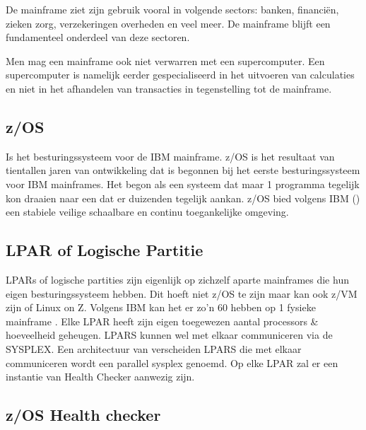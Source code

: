 De mainframe ziet zijn gebruik vooral in volgende sectors: banken, financiën, zieken zorg, verzekeringen overheden en veel meer. De mainframe blijft een fundamenteel onderdeel van deze sectoren.  

Men mag een mainframe ook niet verwarren met een supercomputer. Een supercomputer is namelijk eerder gespecialiseerd in het uitvoeren van calculaties en niet in het afhandelen van transacties in tegenstelling tot de mainframe. 

\subsection{z/OS}
\label{subsec: z/OS Literatuurstudie}

Is het besturingssysteem voor de IBM mainframe. z/OS is het resultaat van tientallen jaren van ontwikkeling dat is begonnen bij het eerste besturingssysteem voor IBM mainframes. Het begon als een systeem dat maar 1 programma tegelijk kon draaien naar een dat er duizenden tegelijk aankan. z/OS bied volgens IBM (\cite{Ebbers2011})  een stabiele veilige schaalbare en continu toegankelijke omgeving. 

\subsection{LPAR of Logische Partitie}
\label{subsec:LPAR of Logische Partitie}

LPARs of logische partities zijn eigenlijk op zichzelf aparte mainframes die hun eigen besturingssysteem hebben. Dit hoeft niet z/OS te zijn maar kan ook z/VM zijn of Linux on Z. Volgens IBM kan het er zo’n 60 hebben op 1 fysieke mainframe \cite{Ebbers2011}. Elke LPAR heeft zijn eigen toegewezen aantal processors \& hoeveelheid geheugen. LPARS kunnen wel met elkaar communiceren via de SYSPLEX. Een architectuur van verscheiden LPARS die met elkaar communiceren wordt een parallel sysplex genoemd. Op elke LPAR zal er een instantie van Health Checker aanwezig zijn. 

\subsection{z/OS Health checker}
\label{subsec:z/OS Health checker}

